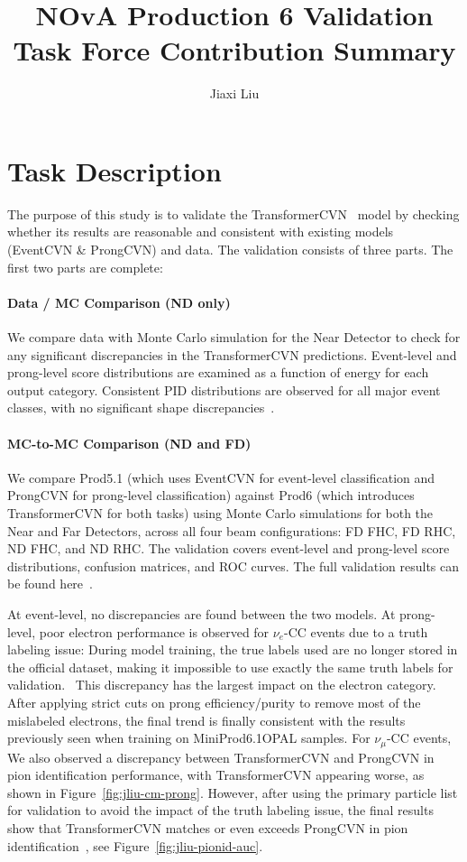 \documentclass{article}
\title{NOvA Production 6 Validation Task Force Contribution Summary}
\author{Jiaxi Liu}
\begin{document}
\maketitle

\section{Task Description}

The purpose of this study is to validate the TransformerCVN~\cite{TransformerCVN}
 model by checking whether its results are reasonable and consistent with existing models (EventCVN \& ProngCVN) and data. The validation consists of three parts. The first two parts are complete:

\paragraph{Data / MC Comparison (ND only)} 
We compare data with Monte Carlo simulation for the Near Detector to check for any significant discrepancies in the TransformerCVN predictions. Event-level and prong-level score distributions are examined as a function of energy for each output category. Consistent PID distributions are observed for all major event classes, with no significant shape discrepancies~\cite{docdb-69340}.

\paragraph{MC-to-MC Comparison (ND and FD)} 
We compare Prod5.1 (which uses EventCVN for event-level classification and ProngCVN for prong-level classification) against Prod6 (which introduces TransformerCVN for both tasks) using Monte Carlo simulations for both the Near and Far Detectors, across all four beam configurations: FD FHC, FD RHC, ND FHC, and ND RHC. The validation covers event-level and prong-level score distributions, confusion matrices, and ROC curves. The full validation results can be found here~\cite{docdb-70060}.


At event-level, no discrepancies are found between the two models. At prong-level, poor electron performance is observed for $\nu_e$-CC events due to a truth labeling issue: During model training, the true labels used are no longer stored in the official dataset, making it impossible to use exactly the same truth labels for validation.~\cite{docdb-69385} This discrepancy has the largest impact on the electron category. After applying strict cuts on prong efficiency/purity to remove most of the mislabeled electrons, the final trend is finally consistent with the results previously seen when training on MiniProd6.1OPAL samples. For $\nu_\mu$-CC events, We also observed a discrepancy between TransformerCVN and ProngCVN in pion identification performance, with TransformerCVN appearing worse, as shown in Figure~\ref{fig:jliu-cm-prong}. However, after using the primary particle list for validation to avoid the impact of the truth labeling issue, the final results show that TransformerCVN matches or even exceeds ProngCVN in pion identification~\cite{docdb-70060}, see Figure~\ref{fig:jliu-pionid-auc}.
\end{document}
